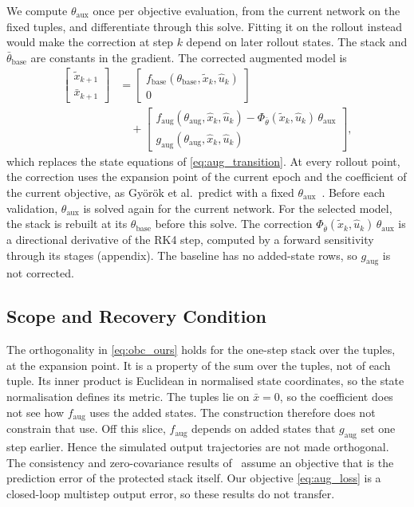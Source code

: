We compute $\theta_{\mathrm{aux}}$ once per objective evaluation, from the
current network on the fixed tuples, and differentiate through this solve.
Fitting it on the rollout instead would make the correction at step $k$
depend on later rollout states.
The stack and $\bar\theta_{\mathrm{base}}$ are constants in the gradient.
The corrected augmented model is
\begin{equation}
\begin{aligned}
 \begin{bmatrix}\tilde x_{k+1}\\ \bar x_{k+1}\end{bmatrix}
 &=\begin{bmatrix}f_{\mathrm{base}}(\theta_{\mathrm{base}},\tilde x_k,\hat u_k)\\ 0\end{bmatrix}\\
 &\quad+\begin{bmatrix}f_{\mathrm{aug}}(\theta_{\mathrm{aug}},\hat x_k,\hat u_k)
   -\Phi_{\bar\theta}(\tilde x_k,\hat u_k)\,\theta_{\mathrm{aux}}\\
   g_{\mathrm{aug}}(\theta_{\mathrm{aug}},\hat x_k,\hat u_k)\end{bmatrix},
\end{aligned}
\label{eq:obc_model}
\end{equation}
which replaces the state equations of \eqref{eq:aug_transition}.
At every rollout point, the correction uses the expansion point of the
current epoch and the coefficient of the current objective, as Gy\"or\"ok
et al.\ predict with a fixed $\theta_{\mathrm{aux}}$~\cite[Eq.~(13)]{gyorok2026obc}.
Before each validation, $\theta_{\mathrm{aux}}$ is solved again for the
current network.
For the selected model, the stack is rebuilt at its $\theta_{\mathrm{base}}$
before this solve.
The correction $\Phi_{\bar\theta}(\tilde x_k,\hat u_k)\,\theta_{\mathrm{aux}}$
is a directional derivative of the RK4 step, computed by a forward
sensitivity through its stages (appendix).
The baseline has no added-state rows, so $g_{\mathrm{aug}}$ is not
corrected.

\subsection{Scope and Recovery Condition}\label{sec:obc_scope}
The orthogonality in \eqref{eq:obc_ours} holds for the one-step stack over
the tuples, at the expansion point.
It is a property of the sum over the tuples, not of each tuple.
Its inner product is Euclidean in normalised state coordinates, so the
state normalisation defines its metric.
The tuples lie on $\bar x=0$, so the coefficient does not see how
$f_{\mathrm{aug}}$ uses the added states.
The construction therefore does not constrain that use.
Off this slice, $f_{\mathrm{aug}}$ depends on added states that
$g_{\mathrm{aug}}$ set one step earlier.
Hence the simulated output trajectories are not made orthogonal.
The consistency and zero-covariance results
of~\cite[Thms.~16, 18]{gyorok2026obc} assume an objective that is the
prediction error of the protected stack itself.
Our objective \eqref{eq:aug_loss} is a closed-loop multistep output error,
so these results do not transfer.


